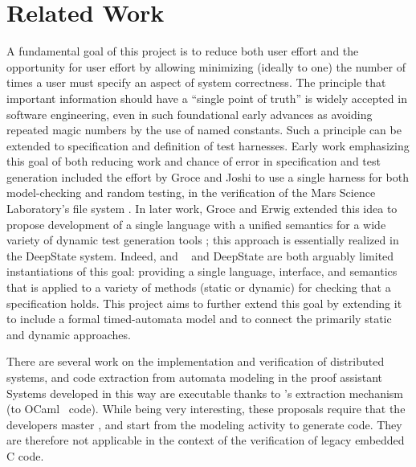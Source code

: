 \section{Related Work}

A fundamental goal of this project is to reduce both user effort and
the opportunity for user effort by allowing minimizing (ideally to
one) the number of times a user must specify an aspect of system
correctness.  The principle that important information should have a
``single point of truth'' is widely accepted in software engineering,
even in such foundational early advances as avoiding repeated magic
numbers by the use of named constants.  Such a principle can be
extended to specification and definition of test harnesses.  Early
work emphasizing this goal of both reducing work and chance of error
in specification and test generation included the effort by Groce and
Joshi to use a single harness for both model-checking and random
testing, in the verification of the Mars Science Laboratory's file
system \cite{WODA08,CFV08,AMAI}.  In later work, Groce and Erwig
extended this idea to propose development of a single language with a
unified semantics for a wide variety of dynamic test generation tools
\cite{WODACommon}; this approach is essentially realized in the
DeepState \cite{DeepState} system.  Indeed, \framac and
\acsl~\cite{ACSL} and DeepState are both arguably limited
instantiations of this goal: providing a single language, interface,
and semantics that is applied to a variety of methods (static or
dynamic) for checking that a specification holds.  This project aims
to further extend this goal by extending it to include a formal
timed-automata model and to connect the primarily static and dynamic approaches.

There are several work on the implementation and verification of distributed systems,
and code extraction from automata modeling in the proof assistant \Coq~\cite{WWP2015:PLDI,WWA2016:CPP,DBLP:conf/tacs/Paulin-Mohring01}
Systems developed in this way are executable thanks to \Coq's extraction mechanism (to OCaml~\cite{MIN2011:CACM} code).
While being very interesting, these proposals require that the developers master \Coq, and start from the modeling activity to generate code.
They are therefore not applicable in the context of the verification of legacy embedded C code.

